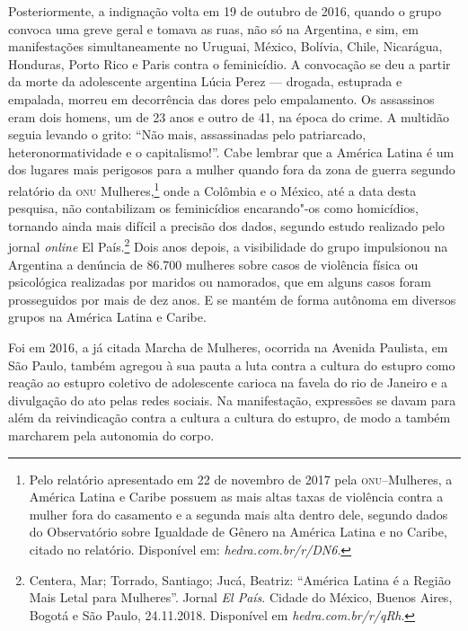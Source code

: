 Posteriormente, a indignação volta em 19 de outubro de 2016, quando o
grupo convoca uma greve geral e tomava as ruas, não só na Argentina, e
sim, em manifestações simultaneamente no Uruguai, México, Bolívia,
Chile, Nicarágua, Honduras, Porto Rico e Paris contra o feminicídio. A
convocação se deu a partir da morte da adolescente argentina Lúcia Perez --- drogada, estuprada e empalada, morreu em decorrência das dores pelo
empalamento. Os assassinos eram dois homens, um de 23 anos e outro de 41,
na época do crime. A multidão seguia levando o grito: ``Não mais,
assassinadas pelo patriarcado, heteronormatividade e o capitalismo!''.
Cabe lembrar que a América Latina é um dos lugares mais perigosos para a
mulher quando fora da zona de guerra segundo relatório da \textsc{onu}
Mulheres,\footnote{Pelo relatório apresentado em 22 de novembro de 2017
  pela \textsc{onu}--Mulheres, a América Latina e Caribe possuem as mais altas
  taxas de violência contra a mulher fora do casamento e a segunda mais
  alta dentro dele, segundo dados do Observatório sobre Igualdade de
  Gênero na América Latina e no Caribe, citado no relatório. Disponível
  em:
  \textit{hedra.com.br/r/DN6}.} onde a Colômbia e o México, até a data desta
pesquisa, não contabilizam os feminicídios encarando"-os como homicídios,
tornando ainda mais difícil a precisão dos dados, segundo estudo
realizado pelo jornal \textit{online} El País.\footnote{Centera, Mar; Torrado,
  Santiago; Jucá, Beatriz: ``América Latina é a Região Mais Letal para
  Mulheres''. Jornal \textit{El País}. Cidade do México, Buenos Aires,
  Bogotá e São Paulo, 24.11.2018. Disponível em
  \textit{hedra.com.br/r/qRh}.} Dois anos depois, a visibilidade do grupo
impulsionou na Argentina a denúncia de 86.700 mulheres sobre casos de
violência física ou psicológica realizadas por maridos ou namorados, que
em alguns casos foram prosseguidos por mais de dez anos. E se mantém de
forma autônoma em diversos grupos na América Latina e Caribe.

Foi em 2016, a já citada Marcha de Mulheres, ocorrida na Avenida
Paulista, em São Paulo, também agregou à sua pauta a luta contra a
cultura do estupro como reação ao estupro coletivo de adolescente
carioca na favela do rio de Janeiro e a divulgação do ato pelas redes
sociais. Na manifestação, expressões se davam para além da reivindicação
contra a cultura a cultura do estupro, de modo a também marcharem pela
autonomia do corpo.

